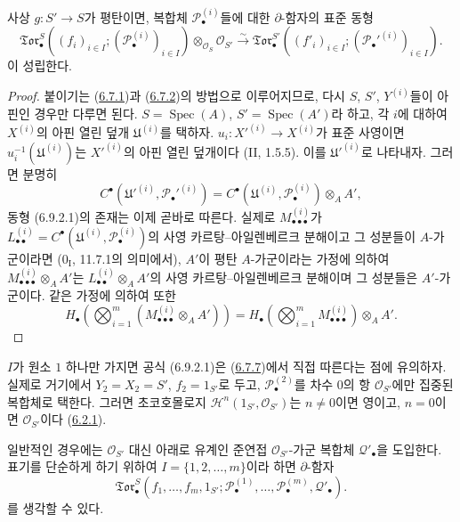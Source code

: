 \begin{proposition}[6.9.2]
\label{III.6.9.2-fr}
사상 $g:S'\to S$가 평탄이면, 복합체
$\mathscr P_\bullet^{(i)}$들에 대한 $\partial$-함자의 표준 동형
\[
  \mathfrak{Tor}_\bullet^S
  ((f_i)_{i\in I};(\mathscr P_\bullet^{(i)})_{i\in I})
  \otimes_{\mathscr O_S}\mathscr O_{S'}
  \xrightarrow{\sim}
  \mathfrak{Tor}_\bullet^{S'}
  ((f'_i)_{i\in I};(\mathscr P_\bullet'^{(i)})_{i\in I}).
  \tag{6.9.2.1}\label{III.6.9.2.1.fr}
\]
이 성립한다.
\end{proposition}

\begin{proof}
붙이기는 (\hyperref[III.6.7.1-fr]{6.7.1})과
(\hyperref[III.6.7.2-fr]{6.7.2})의 방법으로 이루어지므로, 다시
$S$, $S'$, $Y^{(i)}$들이 아핀인 경우만 다루면 된다.
$S=\operatorname{Spec}(A)$, $S'=\operatorname{Spec}(A')$라 하고,
각 $i$에 대하여 $X^{(i)}$의 아핀 열린 덮개
$\mathfrak U^{(i)}$를 택하자. $u_i:X'^{(i)}\to X^{(i)}$가 표준
사영이면 $u_i^{-1}(\mathfrak U^{(i)})$는 $X'^{(i)}$의 아핀 열린
덮개이다 (II, 1.5.5). 이를 $\mathfrak U'^{(i)}$로 나타내자.
그러면 분명히
\[
  C^\bullet(\mathfrak U'^{(i)},\mathscr P_\bullet'^{(i)})
  =C^\bullet(\mathfrak U^{(i)},\mathscr P_\bullet^{(i)})\otimes_A A',
\]
동형 (6.9.2.1)의 존재는 이제 곧바로 따른다. 실제로
$M_{\bullet\bullet\bullet}^{(i)}$가
$L_{\bullet\bullet}^{(i)}
=C^\bullet(\mathfrak U^{(i)},\mathscr P_\bullet^{(i)})$의
사영 카르탕--아일렌베르크 분해이고 그 성분들이 $A$-가군이라면
($0_{\mathrm I}$, 11.7.1의 의미에서), $A'$이 평탄 $A$-가군이라는 가정에 의하여
$M_{\bullet\bullet\bullet}^{(i)}\otimes_A A'$는
$L_{\bullet\bullet}^{(i)}\otimes_A A'$의 사영
카르탕--아일렌베르크 분해이며 그 성분들은 $A'$-가군이다. 같은 가정에
의하여 또한
\[
  H_\bullet\left(
    \bigotimes_{i=1}^m
    (M_{\bullet\bullet\bullet}^{(i)}\otimes_A A')
  \right)
  =H_\bullet\left(
    \bigotimes_{i=1}^m M_{\bullet\bullet\bullet}^{(i)}
  \right)\otimes_A A'.
\]
\end{proof}

\begin{env}[6.9.2.2]
\label{III.6.9.2.2-fr}
$I$가 원소 $1$ 하나만 가지면 공식 (6.9.2.1)은
(\hyperref[III.6.7.7-fr]{6.7.7})에서 직접 따른다는 점에 유의하자.
실제로 거기에서 $Y_2=X_2=S'$, $f_2=1_{S'}$로 두고,
$\mathscr P_\bullet^{(2)}$를 차수 $0$의 항
$\mathscr O_{S'}$에만 집중된 복합체로 택한다. 그러면
초코호몰로지 $\mathscr H^n(1_{S'},\mathscr O_{S'})$는
$n\ne0$이면 영이고, $n=0$이면 $\mathscr O_{S'}$이다
(\hyperref[III.6.2.1-fr]{6.2.1}).
\end{env}

일반적인 경우에는 $\mathscr O_{S'}$ 대신 아래로 유계인 준연접
$\mathscr O_{S'}$-가군 복합체 $\mathscr Q'_\bullet$을 도입한다.
표기를 단순하게 하기 위하여 $I=\{1,2,\ldots,m\}$이라 하면
$\partial$-함자
\[
  \mathfrak{Tor}_\bullet^S
  (f_1,\ldots,f_m,1_{S'};
   \mathscr P_\bullet^{(1)},\ldots,\mathscr P_\bullet^{(m)},
   \mathscr Q'_\bullet).
\]
를 생각할 수 있다.

